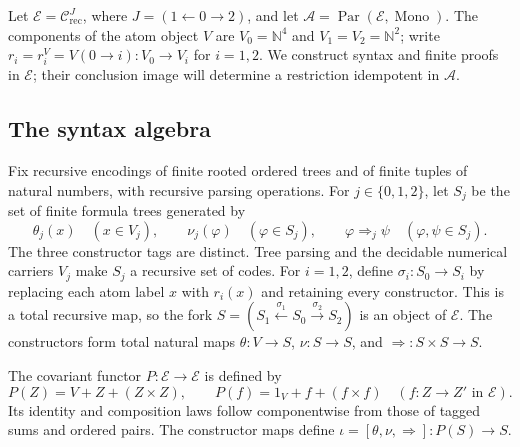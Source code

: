 \documentclass[11pt]{article}
\newcommand{\N}{\mathbb N}
\begin{document}
Let $\mathcal E=\mathcal C_{\mathrm{rec}}^{J}$, where
$J=(1\leftarrow0\to2)$, and let
$\mathcal A=\operatorname{Par}(\mathcal E,\operatorname{Mono})$.
The components of the atom object $V$ are $V_0=\N^4$ and
$V_1=V_2=\N^2$; write $r_i=r_i^V=V(0\to i):V_0\to V_i$
for $i=1,2$.
We construct syntax and finite proofs in $\mathcal E$; their
conclusion image will determine a restriction idempotent in $\mathcal A$.

\subsection{The syntax algebra}

Fix recursive encodings of finite rooted ordered trees and of finite
tuples of natural numbers, with recursive parsing operations. For
$j\in\{0,1,2\}$, let $S_j$ be the set of finite formula trees
generated by
\[
 \theta_j(x)\quad(x\in V_j),\qquad
 \nu_j(\varphi)\quad(\varphi\in S_j),\qquad
 \varphi\Rightarrow_j\psi\quad(\varphi,\psi\in S_j).
\]
The three constructor tags are distinct. Tree parsing and the
decidable numerical carriers $V_j$ make $S_j$ a recursive set of
codes. For $i=1,2$, define $\sigma_i:S_0\to S_i$ by replacing
each atom label $x$ with $r_i(x)$ and retaining every constructor.
This is a total recursive map, so the fork
$S=(S_1\xleftarrow{\sigma_1}S_0\xrightarrow{\sigma_2}S_2)$
is an object of $\mathcal E$. The constructors form total natural
maps $\theta:V\to S$, $\nu:S\to S$, and
$\Rightarrow:S\times S\to S$.

The covariant functor $P:\mathcal E\to\mathcal E$ is defined by
\[
 P(Z)=V+Z+(Z\times Z),\qquad
 P(f)=1_V+f+(f\times f)
 \quad(f:Z\to Z'\text{ in }\mathcal E).
\]
Its identity and composition laws follow componentwise from those
of tagged sums and ordered pairs. The constructor maps define
$\iota=[\theta,\nu,\Rightarrow]:P(S)\to S$.
\end{document}
